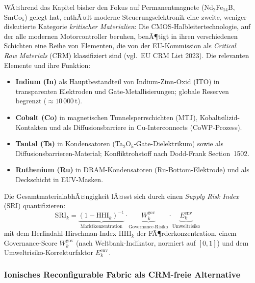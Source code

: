 ﻿\documentclass[12pt, a4paper]{report}
\theoremstyle{definition}
\theoremstyle{remark}
\begin{document}
WÃ¤hrend das Kapitel bisher den Fokus auf Permanentmagnete
(Nd$_2$Fe$_{14}$B, SmCo$_5$) gelegt hat, enthÃ¤lt moderne
Steuerungselektronik eine zweite, weniger diskutierte Kategorie
\emph{kritischer Materialien}: Die CMOS-Halbleitertechnologie, auf der
alle modernen Motorcontroller beruhen, benÃ¶tigt in ihren verschiedenen
Schichten eine Reihe von Elementen, die von der EU-Kommission als
\emph{Critical Raw Materials} (CRM) klassifiziert sind
(vgl.\ EU CRM List 2023). Die relevanten Elemente und ihre Funktion:
\begin{itemize}
  \item \textbf{Indium (In)} als Hauptbestandteil von
    Indium-Zinn-Oxid (ITO) in transparenten Elektroden und
    Gate-Metallisierungen; globale Reserven begrenzt ($\approx 10\,000\,\text{t}$).
  \item \textbf{Cobalt (Co)} in magnetischen Tunnelsperrschichten
    (MTJ), Kobaltsilizid-Kontakten und als Diffusionsbarriere in
    Cu-Interconnects (CoWP-Prozess).
  \item \textbf{Tantal (Ta)} in Kondensatoren (Ta$_2$O$_5$-Gate-Dielektrikum)
    sowie als Diffusionsbarrieren-Material; Konfliktrohstoff nach
    Dodd-Frank Section~1502.
  \item \textbf{Ruthenium (Ru)} in DRAM-Kondensatoren (Ru-Bottom-Elektrode)
    und als Deckschicht in EUV-Masken.
\end{itemize}
Die GesamtmaterialabhÃ¤ngigkeit lÃ¤sst sich durch einen
\emph{Supply Risk Index} (SRI) quantifizieren:
\begin{equation}
  \mathrm{SRI}_k
  = \underbrace{(1-\mathrm{HHI}_k)^{-1}}_{\text{Marktkonzentration}}
    \cdot
    \underbrace{W_k^{\mathrm{gov}}}_{\text{Governance-Risiko}}
    \cdot
    \underbrace{E_k^{\mathrm{env}}}_{\text{Umweltrisiko}}
  \label{eq:sri}
\end{equation}
mit dem Herfindahl-Hirschman-Index $\mathrm{HHI}_k$ der
FÃ¶rderkonzentration, einem Governance-Score $W_k^{\mathrm{gov}}$
(nach Weltbank-Indikator, normiert auf $[0,1]$) und dem
Umweltrisiko-Korrektur\-faktor $E_k^{\mathrm{env}}$.

\subsubsection{Ionisches Reconfigurable Fabric als CRM-freie Alternative}
\end{document}
